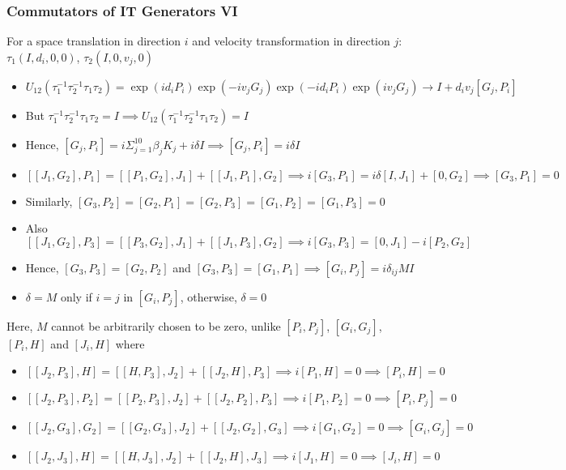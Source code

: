 \documentclass[8pt,t,mathserif,aspectratio=169]{beamer}
\begin{document}
\begin{frame}
  \frametitle{Commutators of IT Generators VI}
  \vspace{1mm}
  For a space translation in direction $i$ and velocity transformation in direction $j$: $\tau_1(I,d_i,0,0)$, $\tau_2(I,0,v_j,0)$
  \begin{itemize}
    \item $U_{12}(\tau^{-1}_1 \tau^{-1}_2 \tau_1 \tau_2) = \exp(i d_i P_i) \exp(-i v_j G_j) \exp(-i d_i P_i) \exp(i v_j G_j) \to I + d_i v_j [G_j,P_i]$
    \item But $\tau^{-1}_1 \tau^{-1}_2 \tau_1 \tau_2 = I \implies U_{12}(\tau^{-1}_1 \tau^{-1}_2 \tau_1 \tau_2) = I$
    \item Hence, $[G_j,P_i] = i \Sigma_{j = 1}^{10} \beta_j K_j + i \delta I \implies [G_j,P_i] = i \delta I$
    \item $[[J_1,G_2],P_1] = [[P_1,G_2],J_1] + [[J_1,P_1],G_2] \implies i[G_3,P_1] = i \delta [I,J_1] + [0,G_2] \implies [G_3,P_1] = 0$
    \item Similarly, $[G_3,P_2] = [G_2,P_1] = [G_2,P_3] = [G_1,P_2] = [G_1,P_3] = 0$
    \item Also $[[J_1,G_2],P_3] = [[P_3,G_2],J_1] + [[J_1,P_3],G_2] \implies i[G_3,P_3] = [0,J_1] -i [P_2,G_2]$
    \item Hence, $[G_3,P_3] = [G_2,P_2]$ and $[G_3,P_3] = [G_1,P_1] \implies [G_i,P_j] = i \delta_{ij} M I$
    \item $\delta = M$ only if $i = j$ in $[G_i,P_j]$, otherwise, $\delta = 0$
  \end{itemize}
  Here, $M$ cannot be arbitrarily chosen to be zero, unlike $[P_i,P_j]$, $[G_i,G_j]$, $[P_i,H]$ and $[J_i,H]$ where
  \begin{itemize}
    \item $[[J_2,P_3],H] = [[H,P_3],J_2] + [[J_2,H],P_3] \implies i[P_1,H] = 0 \implies [P_i,H] = 0$
    \item $[[J_2,P_3],P_2] = [[P_2,P_3],J_2] + [[J_2,P_2],P_3] \implies i[P_1,P_2] = 0 \implies [P_i,P_j] = 0$
    \item $[[J_2,G_3],G_2] = [[G_2,G_3],J_2] + [[J_2,G_2],G_3] \implies i[G_1,G_2] = 0 \implies [G_i,G_j] = 0$
    \item $[[J_2,J_3],H] = [[H,J_3],J_2] + [[J_2,H],J_3] \implies i[J_1,H] = 0 \implies [J_i,H] = 0$
  \end{itemize}
\end{frame}
\end{document}
